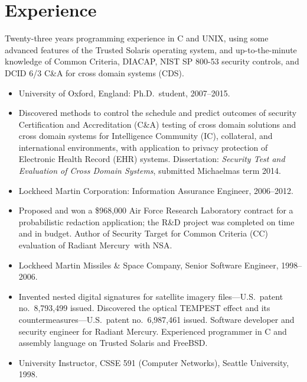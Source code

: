 \documentclass[12pt,twoside,letterpaper]{article}
\providecommand{\rmtrademark}{\raisebox{\height}{\tiny (TM)}}
\newenvironment{myquote}{\list{}{\leftmargin=0.15in\rightmargin=0in}\item[]}{\endlist}
\begin{document}
\vspace{-8mm}
\section*{Experience}
\vspace{-2mm}

Twenty-three years programming experience in C and UNIX, using some
advanced features of the Trusted Solaris operating system, and
up-to-the-minute knowledge of Common Criteria, DIACAP, NIST SP 800-53
security controls, and DCID 6/3 C\&A for cross domain systems (CDS).

\begin{itemize}
	\item University of Oxford, England: Ph.D.\ student, 2007--2015.
		\vspace{-2mm}
		\begin{myquote}
            Discovered methods to control the schedule and predict
            outcomes of security Certification and Accreditation (C\&A)
            testing of cross domain solutions and cross domain systems for
            Intelligence Community (IC), collateral, and international
            environments, with application to privacy protection
            of Electronic Health Record (EHR) systems. Dissertation:
            \emph{Security Test and Evaluation of Cross Domain Systems},
            submitted Michaelmas term 2014.
		\end{myquote}
\vspace{-2.5mm}
	\item Lockheed Martin Corporation: Information Assurance Engineer, 2006--2012.
		\vspace{-2mm}
		\begin{myquote}
            Proposed and won a \$968,000 Air Force Research Laboratory
            contract for a probabilistic redaction application; the
            R\&D project was completed on time and in budget. Author of
            Security Target for Common Criteria (CC) evaluation of Radiant
            Mercury\rmtrademark\ with NSA.
		\end{myquote}
\vspace{-2.5mm}
	\item Lockheed Martin Missiles \& Space Company, Senior Software Engineer, 1998--2006.
		\vspace{-2mm}
		\begin{myquote}
            Invented nested digital signatures for satellite imagery
            files---U.S.\ patent no.~8,793,499 issued. Discovered the
            optical TEMPEST effect and its countermeasures---U.S.\ patent
            no.~6,987,461 issued. Software developer and security engineer
            for Radiant Mercury\rmtrademark. Experienced programmer in C
            and assembly language on Trusted Solaris and FreeBSD.
		\end{myquote}
\vspace{-2.5mm}
	\item University Instructor, CSSE 591 (Computer Networks), Seattle University, 1998.
\end{itemize}
\end{document}
